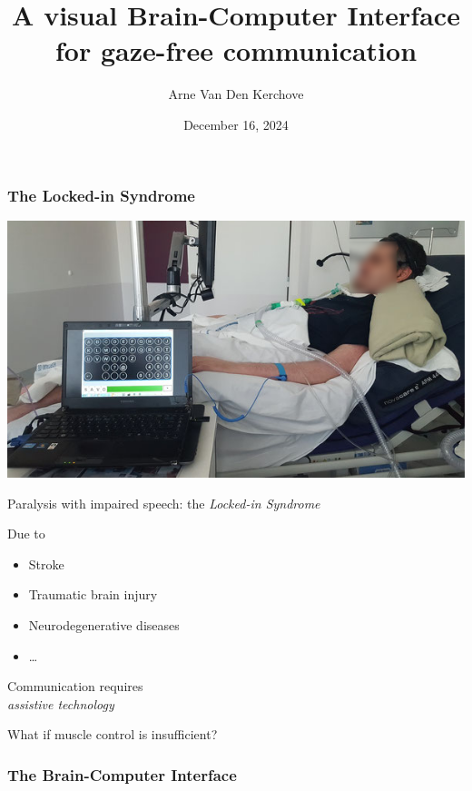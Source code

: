 \documentclass{kul-ulille-beamer}
\title{%
  A visual Brain-Computer Interface \\
  for gaze-free communication
}
\author{Arne Van Den Kerchove}
\date{December 16, 2024}
\begin{document}

\titleframe


\begin{frame}
  \frametitle{The Locked-in Syndrome}
  \centering

  \begin{minipage}[c]{.5\textwidth}
    \includegraphics[width=\textwidth]{figures/intro/damien-obfuscated.jpg}
  \end{minipage}\hfill%
  \begin{minipage}[c]{.4\textwidth}
    \raggedright
    Paralysis with impaired speech:
    the \emph{Locked-in Syndrome}
    \bigskip

    Due to
    \begin{itemize}
      \item Stroke
      \item Traumatic brain injury
      \item Neurodegenerative diseases
      \item \ldots
    \end{itemize}
    \bigskip

  Communication requires \\ \emph{assistive technology}
  \bigskip

  What if muscle control is insufficient?
  \end{minipage}
\end{frame}


%
\begin{frame}
  \frametitle{The Brain-Computer Interface}
\end{frame}
\end{document}
